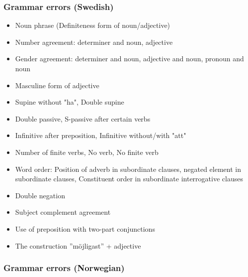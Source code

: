 \documentclass[a4paper,english,12pt]{article}
\begin{document}
\begin{spacing}{1.0}
\subsubsection{Grammar errors (Swedish)}

\begin{itemize}
    \item Noun phrase (Definiteness form of noun/adjective)
    \item Number agreement: determiner and noun, adjective
    \item Gender agreement: determiner and noun, adjective and noun, pronoun and noun 
    \item Masculine form of adjective %
	\item	 Supine without "ha",    Double supine 
	\item    Double passive,    S-passive after certain verbs   
	\item  Infinitive after preposition, Infinitive without/with "att"
	\item    Number of finite verbs, No verb, No finite verb
	\item   Word order:  Position of adverb in subordinate clauses, negated element in subordinate clauses, Constituent order in subordinate interrogative clauses
	\item    Double negation
	\item     Subject complement agreement
	\item    Use of preposition with two-part conjunctions 
	\item    The construction ”möjligast” + adjective
\end{itemize}

\subsubsection{Grammar errors (Norwegian)}



\end{spacing}
\end{document}
